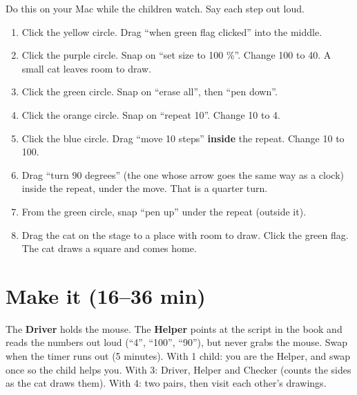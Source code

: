 \begin{workedexample}
Do this on your Mac while the children watch. Say each step out loud.
\begin{enumerate}[leftmargin=1.4em,itemsep=1pt]
  \item Click the yellow  circle. Drag \enquote{when green flag clicked} into the middle.
  \item Click the purple  circle. Snap on \enquote{set size to 100 \%}. Change 100 to 40. A small cat leaves room to draw.
  \item Click the green  circle. Snap on \enquote{erase all}, then \enquote{pen down}.
  \item Click the orange  circle. Snap on \enquote{repeat 10}. Change 10 to 4.
  \item Click the blue  circle. Drag \enquote{move 10 steps} \textbf{inside} the repeat. Change 10 to 100.
  \item Drag \enquote{turn 90 degrees} (the one whose arrow goes the same way as a clock) inside the repeat, under the move. That is a quarter turn.
  \item From the green  circle, snap \enquote{pen up} under the repeat (outside it).
  \item Drag the cat on the stage to a place with room to draw. Click the green flag. The cat draws a square and comes home.
\end{enumerate}
\begin{center}
\begin{scratch}[scale=0.85]
\end{scratch}
\end{center}
\end{workedexample}

\section{Make it (16--36 min)}
\begin{pairroles}
The \textbf{Driver} holds the mouse. The \textbf{Helper} points at the script in the book and reads the numbers out loud (\enquote{4}, \enquote{100}, \enquote{90}), but never grabs the mouse. Swap when the timer runs out (5 minutes). With 1 child: you are the Helper, and swap once so the child helps you. With 3: Driver, Helper and Checker (counts the sides as the cat draws them). With 4: two pairs, then visit each other's drawings.
\end{pairroles}

